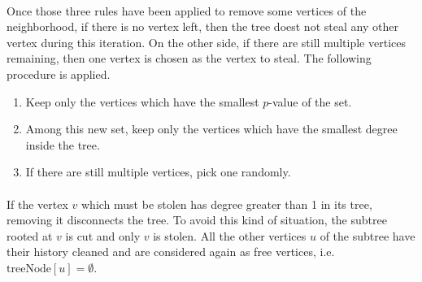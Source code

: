 \paragraph{}
Once those three rules have been applied to remove some vertices of the
neighborhood, if there is no vertex left, then the tree doest not steal
any other vertex during this iteration. On the other side, if there are still
multiple vertices remaining, then one vertex is chosen as the vertex to
steal. The following procedure is applied.
\begin{enumerate}
\item Keep only the vertices which have the smallest $p$-value of the set.
\item Among this new set, keep only the vertices which have the smallest
  degree inside the tree.
\item If there are still multiple vertices, pick one randomly.
\end{enumerate}

\paragraph{\label{cutoff-subtrees}}
If the vertex $v$ which must be stolen has degree greater than 1 in
its tree, removing it disconnects the tree. To avoid this kind of
situation, the subtree rooted at $v$ is cut and only $v$ is
stolen. All the other vertices $u$ of the subtree have their history
cleaned and are considered again as free vertices, i.e.
$\mathrm{treeNode}[u] = \emptyset$.